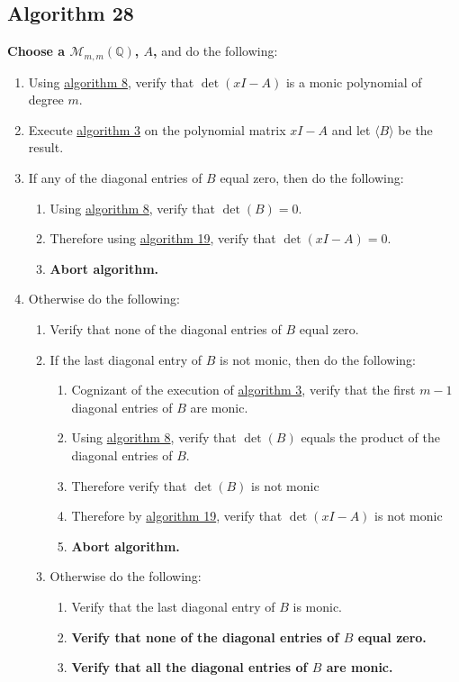 \documentclass[twocolumn]{article}
\begin{document}
		\subsection{Algorithm 28}\label{sec:algorithm 28}
			\textbf{Choose a $\mathcal{M}_{m,m}(\mathbb{Q})$, $A$,} and do the following:
			\begin{enumerate}
				\item Using \hyperref[sec:algorithm 8]{algorithm 8}, verify that $\det(xI-A)$ is a monic polynomial of degree $m$.
				\item Execute \hyperref[sec:algorithm 3]{algorithm 3} on the polynomial matrix $xI-A$ and let $\langle B\rangle$ be the result.
				\item If any of the diagonal entries of $B$ equal zero, then do the following:
				\begin{enumerate}
					\item Using \hyperref[sec:algorithm 8]{algorithm 8}, verify that $\det(B)=0$.
					\item Therefore using \hyperref[sec:algorithm 19]{algorithm 19}, verify that $\det(xI-A)=0$.
					\item \textbf{Abort algorithm.}
				\end{enumerate}
				\item Otherwise do the following:
				\begin{enumerate}
					\item Verify that none of the diagonal entries of $B$ equal zero.
					\item If the last diagonal entry of $B$ is not monic, then do the following:
					\begin{enumerate}
						\item Cognizant of the execution of \hyperref[sec:algorithm 3]{algorithm 3}, verify that the first $m-1$ diagonal entries of $B$ are monic.
						\item Using \hyperref[sec:algorithm 8]{algorithm 8}, verify that $\det(B)$ equals the product of the diagonal entries of $B$.
						\item Therefore verify that $\det(B)$ is not monic
						\item Therefore by \hyperref[sec:algorithm 19]{algorithm 19}, verify that $\det(xI-A)$ is not monic
						\item \textbf{Abort algorithm.}
					\end{enumerate}
					\item Otherwise do the following:
					\begin{enumerate}
						\item Verify that the last diagonal entry of $B$ is monic.
						\item \textbf{Verify that none of the diagonal entries of $B$ equal zero.}
						\item \textbf{Verify that all the diagonal entries of $B$ are monic.}
					\end{enumerate}
				\end{enumerate}
			\end{enumerate}
\end{document}
